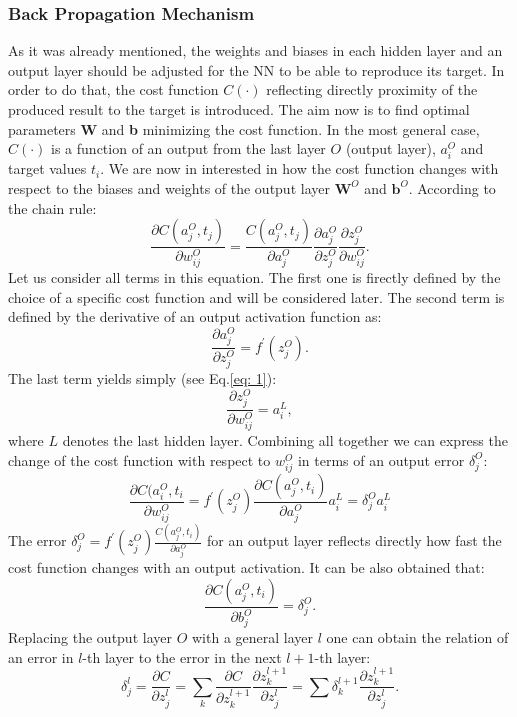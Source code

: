 \documentclass{emulateapj}
\begin{document}
\subsubsection{Back Propagation Mechanism}
\label{subsubsec: back propagation}

As it was already mentioned, the weights and biases in each hidden layer and an output layer should be adjusted for the NN to be able to reproduce its target. In order to do that, the cost function $C(\cdot)$ reflecting directly proximity of the produced result to the target is introduced. The aim now is to find optimal parameters \textbf{W} and \textbf{b} minimizing the cost function. In the most general case, $C(\cdot)$ is a function of an output from the last layer $O$ (output layer), $a_i^O$ and target values $t_i$. We are now in interested in how the cost function changes with respect to the biases and weights of the output layer $\textbf{W}^O$ and $\textbf{b}^O$. According to the chain rule:
\begin{equation}
    \frac{\partial C(a_j^O, t_j)}{\partial w_{ij}^O}=\frac{C(a_j^O, t_j)}{\partial a_{j}^O}\frac{\partial a_{j}^O}{\partial z_{j}^O}\frac{\partial z_{j}^O}{\partial w_{ij}^O}.
\end{equation}
Let us consider all terms in this equation. The first one is firectly defined by the choice of a specific cost function and will be considered later. The second term is defined by the derivative of an output activation function as:
\begin{equation}
    \frac{\partial a_{j}^O}{\partial z_{j}^O} = f^{\prime}(z_{j}^O).
\end{equation}
The last term yields simply (see Eq.\ref{eq: 1}):
\begin{equation}
    \frac{\partial z_{j}^O}{\partial w_{ij}^O}=a^L_i,
\end{equation}
where $L$ denotes the last hidden layer. Combining all together we can express the change of the cost function with respect to $w_{ij}^O$ in terms of an output error $\delta_{j}^O$:
\begin{equation}
    \frac{\partial C(a_i^O, t_i}{\partial w_{ij}^O}=f^{\prime}(z_{j}^O)\frac{\partial C(a_j^O, t_i)}{\partial a_{j}^O}a^L_i= \delta_j^Oa^L_i
\end{equation}
The error $\delta_j^O=f^{\prime}(z_{j}^O)\frac{C(a_j^O, t_i)}{\partial a_{j}^O}$ for an output layer reflects directly how fast the cost function changes with an output activation. It can be also obtained that:
\begin{equation}
    \frac{\partial C(a_j^O, t_i)}{\partial b_{j}^O}=\delta_j^O.
\end{equation}
Replacing the output layer $O$ with a general layer $l$ one can obtain the relation of an error in $l$-th layer to the error in the next $l+1$-th layer:
\begin{equation}
\label{eq: 2}
    \delta_j^l=\frac{\partial C}{\partial z_{j}^l}=\sum_k \frac{\partial C}{\partial z_{k}^{l+1}}\frac{\partial z_{k}^{l+1}}{\partial z_{j}^{l}}=\sum \delta_k^{l+1}\frac{\partial z_{k}^{l+1}}{\partial z_{j}^{l}}.
\end{equation}
\end{document}
